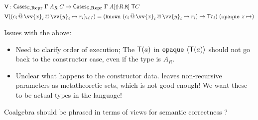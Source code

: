 \begin{align*}
   & \fun V            : \fun{Cases}_{\catG, \mR}\; \Gamma\; A_R \; C \to  \fun{Cases}_{\catG, \mR}\; \Gamma\; A[\lift{R.\defin{R}}] \; \fun T C                                                               \\
   & \fun V((c_{i} \, \hat{@} \, \vv{x}_i \,@\, \vv{y}_i \mapsto r_i)_{i\in I}) = (\defin{known}\ (c_{i} \, \hat{@} \, \vv{x}_i \,@\, \vv{y}_i \mapsto r_i) \mapsto \fun T r_i)\; (\defin{opaque}\ z \mapsto )
\end{align*}

Issues with the above:

\begin{itemize}
  \item Need to clarify order of execution; The ${\textsf{T}}(a)$ in $\texttt{opaque}\
          \langle{{\textsf{T}}(a)}\rangle$ should not go back to the constructor case, even if the type
        is $A_R$.
  \item Unclear what happens to the constructor data. \cite{Kaposi2020-is} leaves
        non-recursive parameters as metatheoretic sets, which is not good enough! We
        want these to be actual types in the language!
\end{itemize}

Coalgebra should be phrased in terms of views for semantic correctness
\cite{Allais2023-pf,Allais2023-zq} ?
